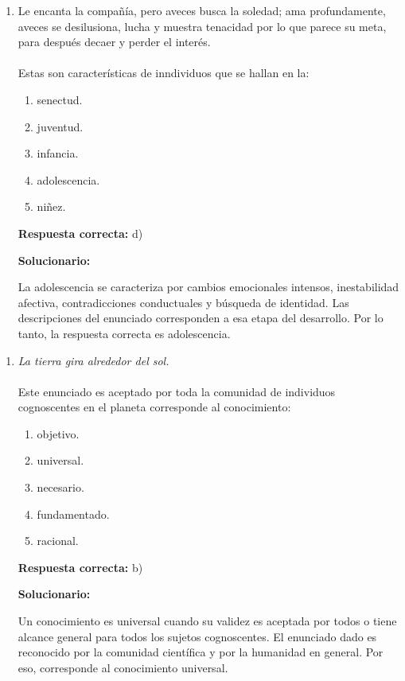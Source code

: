 \begin{enumerate}[resume]
	
	\item Le encanta la compañía, pero aveces busca la soledad; ama profundamente, aveces se desilusiona, lucha y muestra tenacidad por lo que parece su meta, para después decaer y perder el interés.\\\\
	Estas son características de inndividuos que se hallan en la:
	
	
	\begin{enumerate}[label=\alph*)]
		\item senectud.
		\item juventud.
		\item infancia.
		\item adolescencia.
		\item niñez.
	\end{enumerate}
	
	\textbf{Respuesta correcta:} d)
	
	\vspace{2mm}
	\textbf{Solucionario:}
	
	La adolescencia se caracteriza por cambios emocionales intensos, inestabilidad afectiva, contradicciones conductuales y búsqueda de identidad. Las descripciones del enunciado corresponden a esa etapa del desarrollo. Por lo tanto, la respuesta correcta es adolescencia.
	
\end{enumerate}



\begin{enumerate}[resume]
	
	\item \textit{La tierra gira alrededor del sol.}\\\\
	Este enunciado es aceptado por toda la comunidad de individuos cognoscentes en el planeta corresponde al conocimiento:
	
	
	\begin{enumerate}[label=\alph*)]
		\item objetivo.
		\item universal.
		\item necesario.
		\item fundamentado.
		\item racional.
	\end{enumerate}
	
	\textbf{Respuesta correcta:} b)
	
	\vspace{2mm}
	\textbf{Solucionario:}
	
	Un conocimiento es universal cuando su validez es aceptada por todos o tiene alcance general para todos los sujetos cognoscentes. El enunciado dado es reconocido por la comunidad científica y por la humanidad en general. Por eso, corresponde al conocimiento universal.
	
\end{enumerate}


